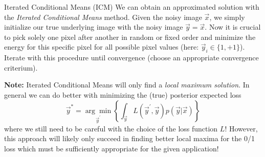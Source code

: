 \begin{topic}{0.3cm}{Iterated Conditional Means (ICM)}
	We can obtain an approximated solution with the \emph{Iterated Conditional Means} method. %
	Given the noisy image \ensuremath{\vec{x}}, we simply initialize our true underlying image with the noisy image \ensuremath{\vec{y} = \vec{x}}. %
	Now it is crucial to pick solely one pixel after another in random or fixed order and minimize the energy for this specific pixel for all possible pixel values (here: \ensuremath{\vec{y}_i\in\{1,+1\}}). %
	Iterate with this procedure until convergence (choose an appropriate convergence criterium). %
	
	\noindent\textbf{Note:} Iterated Conditional Means will only find a \emph{local maximum solution}. %
	In general we can do better with minimizing the (true) posterior expected loss %
	\begin{equation}
		\vec{y}^* = \underset{\vec{y}^\prime}{\arg\min}\left\{ \int_{\vec{y}} L(\vec{y}^\prime,\vec{y}) p(\vec{y}|\vec{x}) \right\}
	\end{equation}
	where we still need to be careful with the choice of the loss function \ensuremath{L}! %
	However, this approach will likely only succeed in finding better local maxima for the 0/1 loss which must be sufficiently appropriate for the given application!
\end{topic}
%
%
%
